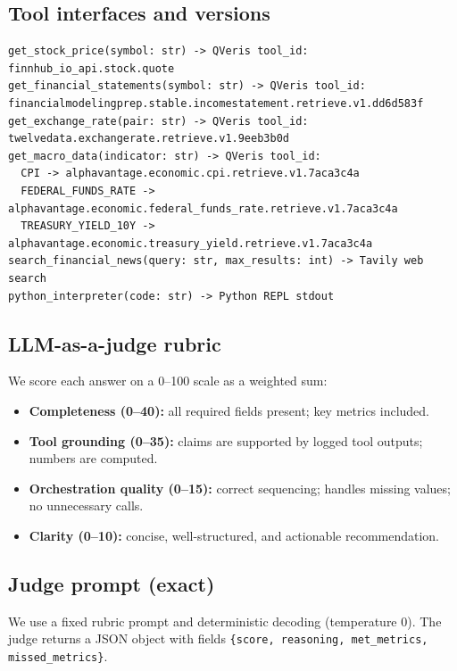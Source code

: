 \documentclass{article}
\begin{document}
\subsection{Tool interfaces and versions}
\begin{verbatim}
get_stock_price(symbol: str) -> QVeris tool_id: finnhub_io_api.stock.quote
get_financial_statements(symbol: str) -> QVeris tool_id: financialmodelingprep.stable.incomestatement.retrieve.v1.dd6d583f
get_exchange_rate(pair: str) -> QVeris tool_id: twelvedata.exchangerate.retrieve.v1.9eeb3b0d
get_macro_data(indicator: str) -> QVeris tool_id:
  CPI -> alphavantage.economic.cpi.retrieve.v1.7aca3c4a
  FEDERAL_FUNDS_RATE -> alphavantage.economic.federal_funds_rate.retrieve.v1.7aca3c4a
  TREASURY_YIELD_10Y -> alphavantage.economic.treasury_yield.retrieve.v1.7aca3c4a
search_financial_news(query: str, max_results: int) -> Tavily web search
python_interpreter(code: str) -> Python REPL stdout
\end{verbatim}

\subsection{LLM-as-a-judge rubric}
We score each answer on a 0--100 scale as a weighted sum:
\begin{itemize}
  \item \textbf{Completeness (0--40):} all required fields present; key metrics included.
  \item \textbf{Tool grounding (0--35):} claims are supported by logged tool outputs; numbers are computed.
  \item \textbf{Orchestration quality (0--15):} correct sequencing; handles missing values; no unnecessary calls.
  \item \textbf{Clarity (0--10):} concise, well-structured, and actionable recommendation.
\end{itemize}

\subsection{Judge prompt (exact)}
We use a fixed rubric prompt and deterministic decoding (temperature 0). The judge returns a JSON object with fields \texttt{\{score, reasoning, met\_metrics, missed\_metrics\}}.
\end{document}
